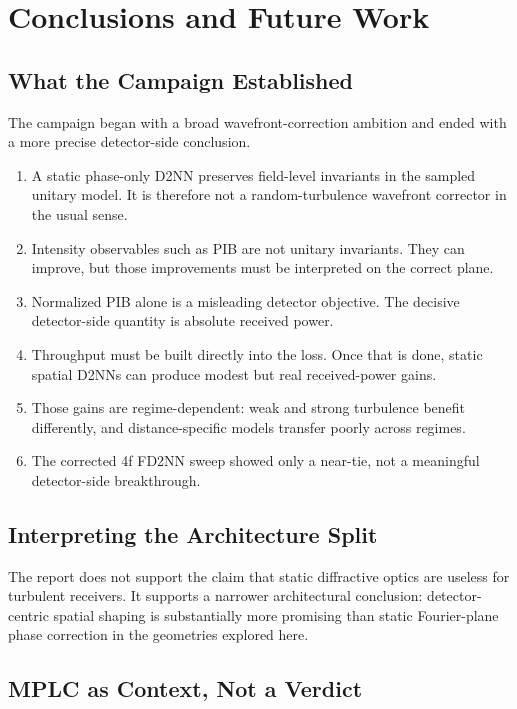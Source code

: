 \chapter{Conclusions and Future Work}

\section{What the Campaign Established}

The campaign began with a broad wavefront-correction ambition and ended with a
more precise detector-side conclusion.

\begin{enumerate}
  \item A static phase-only D2NN preserves field-level invariants in the sampled
  unitary model. It is therefore not a random-turbulence wavefront corrector in
  the usual sense.
  \item Intensity observables such as PIB are not unitary invariants. They can
  improve, but those improvements must be interpreted on the correct plane.
  \item Normalized PIB alone is a misleading detector objective. The decisive
  detector-side quantity is absolute received power.
  \item Throughput must be built directly into the loss. Once that is done,
  static spatial D2NNs can produce modest but real received-power gains.
  \item Those gains are regime-dependent: weak and strong turbulence benefit
  differently, and distance-specific models transfer poorly across regimes.
  \item The corrected 4f FD2NN sweep showed only a near-tie, not a meaningful
  detector-side breakthrough.
\end{enumerate}

\section{Interpreting the Architecture Split}

The report does not support the claim that static diffractive optics are useless
for turbulent receivers. It supports a narrower architectural conclusion:
detector-centric spatial shaping is substantially more promising than static
Fourier-plane phase correction in the geometries explored here.

\section{MPLC as Context, Not a Verdict}

